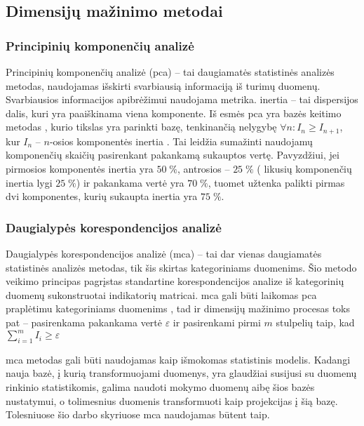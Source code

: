 \subsection{Dimensijų mažinimo metodai}

\subsubsection{Principinių komponenčių analizė}

Principinių komponenčių analizė (\gls{pca}) -- tai daugiamatės statistinės analizės metodas, naudojamas išskirti svarbiausią informaciją iš turimų duomenų. Svarbiausios informacijos apibrėžimui naudojama  metrika. \Gls{inertia} -- tai dispersijos dalis, kuri yra paaiškinama viena komponente. Iš esmės \gls{pca} yra bazės keitimo metodas , kurio tikslas yra parinkti bazę, tenkinančią nelygybę $\forall n: I_n \ge I_{n+1}$, kur $I_n$ -- $n$-osios komponentės \gls{inertia} \cite{abdiPrincipalComponentAnalysis2010}. Tai leidžia sumažinti naudojamų komponenčių skaičių pasirenkant pakankamą sukauptos  vertę. Pavyzdžiui, jei pirmosios komponentės \gls{inertia} yra $50\;\%$, antrosios -- $25\;\%$ (\rightarrow \; likusių komponenčių \gls{inertia} lygi $25\;\%$) ir pakankama  vertė yra $70\;\%$, tuomet užtenka palikti pirmas dvi komponentes, kurių sukaupta \gls{inertia}  yra $75\;\%$.

\subsubsection{Daugialypės korespondencijos analizė}\label{sec:literature:dimensions:mca}

Daugialypės korespondencijos analizė (\gls{mca}) -- tai dar vienas daugiamatės statistinės analizės metodas, tik šis skirtas kategoriniams duomenims. Šio metodo veikimo principas pagrįstas standartine korespondencijos analize  iš kategorinių duomenų sukonstruotai indikatorių matricai. \gls{mca} gali būti laikomas \gls{pca} praplėtimu kategoriniams duomenims \cite{abdiMultipleCorrespondenceAnalysis2007}, tad ir dimensijų mažinimo procesas toks pat -- pasirenkama pakankama  vertė $\varepsilon$ ir pasirenkami pirmi $m$ stulpelių taip, kad $\sum_{i=1}^m{I_i} \ge \varepsilon$

\gls{mca} metodas gali būti naudojamas kaip išmokomas statistinis modelis. Kadangi nauja bazė, į kurią transformuojami duomenys, yra glaudžiai susijusi su duomenų rinkinio statistikomis, galima naudoti mokymo duomenų aibę šios bazės nustatymui, o tolimesnius duomenis transformuoti kaip projekcijas į šią bazę. Tolesniuose šio darbo skyriuose \gls{mca} naudojamas būtent taip.